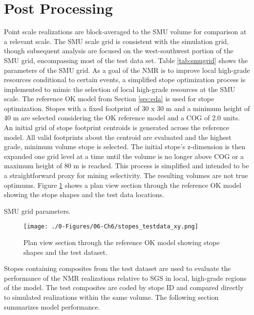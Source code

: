 \FloatBarrier
\section{Post Processing}
\label{sec:post}

Point scale realizations are block-averaged to the \gls{SMU} volume for comparison at a relevant scale. The \gls{SMU} scale grid is consistent with the simulation grid, though subsequent analysis are focused on the west-southwest portion of the \gls{SMU} grid, encompassing most of the test data set. Table \ref{tab:smugrid} shows the parameters of the \gls{SMU} grid. As a goal of the \gls{NMR} is to improve local high-grade resources conditional to certain events, a simplified stope optimization process is implemented to mimic the selection of local high-grade resources at the \gls{SMU} scale. The reference \gls{OK} model from Section \ref{sec:eda} is used for stope optimization. Stopes with a fixed footprint of 30 x 30 m and a minimum height of 40 m are selected considering the \gls{OK} reference model and a \gls{COG} of 2.0 units. An initial grid of stope footprint centroids is generated across the reference model. All valid footprints about the centroid are evaluated and the highest grade, minimum volume stope is selected. The initial stope's z-dimension is then expanded one grid level at a time until the volume is no longer above \gls{COG} or a maximum height of 80 m is reached. This process is simplified and intended to be a straightforward proxy for mining selectivity. The resulting volumes are not true optimums. Figure \ref{fig:stopes_testdata_xy} shows a plan view section through the reference \gls{OK} model showing the stope shapes and the test data locations.

\begin{table}[!htb]
    \centering
    \caption{\Gls{SMU} grid parameters.}
    \resizebox{0.9\width}{!}{}
    \label{tab:smugrid}
\end{table}

\begin{figure}[htb!]
    \centering
    \texttt{[image: ./0-Figures/06-Ch6/stopes\_testdata\_xy.png]}
    \caption{Plan view section through the reference \gls{OK} model showing stope shapes and the test dataset. }
    \label{fig:stopes_testdata_xy}
\end{figure}

Stopes containing composites from the test dataset are used to evaluate the performance of the \gls{NMR} realizations relative to \gls{SGS} in local, high-grade regions of the model. The test composites are coded by stope ID and compared directly to simulated realizations within the same volume. The following section summarizes model performance.

